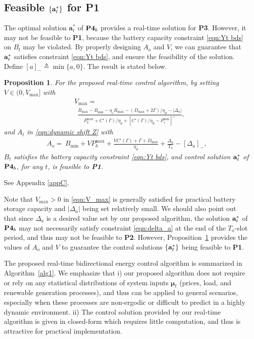 \documentclass[journal]{IEEEtran}
\def\mubf{\boldsymbol \mu }
\def\abf{{\bf a}}
\def\nn{\nonumber}
\newtheorem{proposition}{Proposition}
\begin{document}
\subsection{Feasible $\{\abf_t^*\}$ for {\bf P1}}\label{subsec:feasibility}
The optimal solution  $\mathbf{a}^*_t$ of $\text{\bf P4}_b$ provides a real-time solution for {\bf P3}. However, it may not be feasible to {\bf P1}, because  the battery  capacity constraint \eqref{eqn:Yt bds} on $B_t$ may be violated. By properly designing $A_o$ and $V$, we can guarantee that $\abf_t^*$ satisfies  constraint \eqref{eqn:Yt bds}, and ensure the feasibility of the solution. Define $[a]_-\triangleq\min\{a,0\}$. The result is stated below.
\begin{proposition} \label{prop1}
For the proposed real-time control algorithm, by setting $V\in (0,V_{\max}]$ with
\begin{align}\label{eqn:V_max}
&V_{\max}= \nn \\
&\ \ \frac{B_{\max}-B_{\min}-\eta_c R_{\max}-(D_{\max}+2\Gamma)/\eta_d-|\Delta_a|}{P_{b}^{\max}+C'(\Gamma)/\eta_d+[C'(\Gamma)/\eta_d-P_{s}^{\min}]^+},
\end{align}
and
 $A_t$ in \eqref{eqn:dynamic shift Z} with
\begin{align}\label{eqn:A_o}
 A_o = \!\! \ B_{\min}\!+\!VP_{b}^{\max}\!+\!\frac{VC'(\Gamma)\!+\Gamma\!+\!D_{\max}}{\eta_d}\!+\!\frac{\Delta_a}{T_o} \!-\![\Delta_a]_-,
\end{align}
 $B_t$ satisfies the battery capacity constraint \eqref{eqn:Yt bds}, and  control solution $\abf_t^*$ of $\text{\bf P4}_b$, for any $t$, is feasible to {\bf P1}.
\end{proposition}
\IEEEproof
See Appendix \ref{appC}.
\endIEEEproof


Note that  $V_{\max}>0$ in \eqref{eqn:V_max} is generally satisfied for practical battery storage capacity and $|\Delta_a|$ being set relatively small.
We should also point out that since $\Delta_a$ is a desired value set by our proposed algorithm, the solution $\abf_t^*$ of ${\bf P4}_b$ may not necessarily satisfy constraint \eqref{eqn:delta_a} at the end of the $T_o$-slot period, and thus may not be feasible to {\bf P2}. However, Proposition~\ref{prop1} provides the values of $A_o$ and $V$ to guarantee the control solutions $\{\abf_t^*\}$ being feasible to {\bf P1}.

The proposed real-time bidirectional energy control algorithm is summarized in Algorithm~\ref{alg1}. We emphasize that  i) our proposed algorithm does not require or rely on any statistical distributions of system inputs $\mubf_t$ (prices, load, and renewable generation processes), and thus can be applied to general scenarios, especially when these processes are non-ergodic or difficult to predict in a highly dynamic environment. ii) The control solution provided by our real-time algorithm is given in closed-form which requires little computation, and thus is attractive for practical implementation.
\end{document}
